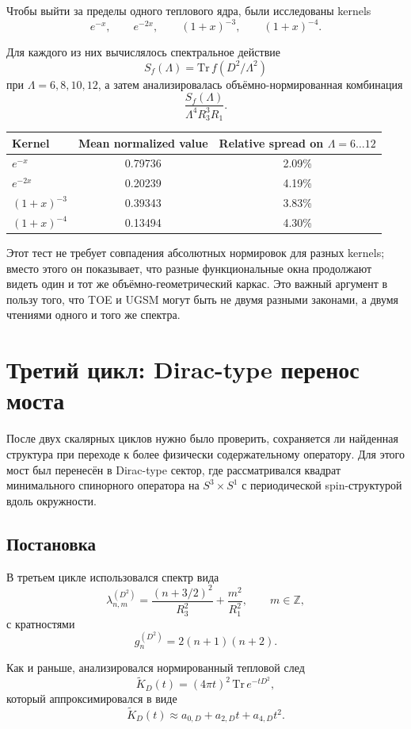 \documentclass[12pt,a4paper]{article}
\begin{document}
Чтобы выйти за пределы одного теплового ядра, были исследованы kernels
\[
e^{-x},\qquad e^{-2x},\qquad (1+x)^{-3},\qquad (1+x)^{-4}.
\]

Для каждого из них вычислялось спектральное действие
\[
S_f(\Lambda)=\mathrm{Tr}\,f(D^2/\Lambda^2)
\]
при \(\Lambda=6,8,10,12\), а затем анализировалась объёмно-нормированная комбинация
\[
\frac{S_f(\Lambda)}{\Lambda^4R_3^3R_1}.
\]

\begin{center}
\begin{tabular}{lcc}
\toprule
Kernel & Mean normalized value & Relative spread on $\Lambda=6\ldots12$ \\
\midrule
$e^{-x}$ & 0.79736 & 2.09\% \\
$e^{-2x}$ & 0.20239 & 4.19\% \\
$(1+x)^{-3}$ & 0.39343 & 3.83\% \\
$(1+x)^{-4}$ & 0.13494 & 4.30\% \\
\bottomrule
\end{tabular}
\end{center}

Этот тест не требует совпадения абсолютных нормировок для разных kernels; вместо этого он показывает, что разные функциональные окна продолжают видеть один и тот же объёмно-геометрический каркас. Это важный аргумент в пользу того, что TOE и UGSM могут быть не двумя разными законами, а двумя чтениями одного и того же спектра.


\section{Третий цикл: Dirac-type перенос моста}

После двух скалярных циклов нужно было проверить, сохраняется ли найденная структура при переходе к более физически содержательному оператору. Для этого мост был перенесён в Dirac-type сектор, где рассматривался квадрат минимального спинорного оператора на \(S^3\times S^1\) с периодической spin-структурой вдоль окружности.

\subsection{Постановка}

В третьем цикле использовался спектр вида
\[
\lambda_{n,m}^{(D^2)}=\frac{(n+3/2)^2}{R_3^2}+\frac{m^2}{R_1^2},
\qquad m\in\mathbb{Z},
\]
с кратностями
\[
g_n^{(D^2)}=2(n+1)(n+2).
\]

Как и раньше, анализировался нормированный тепловой след
\[
\widetilde K_D(t)=(4\pi t)^2\,\mathrm{Tr}\,e^{-tD^2},
\]
который аппроксимировался в виде
\[
\widetilde K_D(t)\approx a_{0,D}+a_{2,D}t+a_{4,D}t^2.
\]
\end{document}
